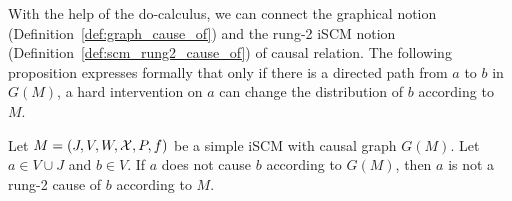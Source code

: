 With the help of the do-calculus, we can connect the graphical notion (Definition~\ref{def:graph_cause_of}) and the rung-2 iSCM notion (Definition~\ref{def:scm_rung2_cause_of}) of causal relation.
The following proposition expresses formally that only if there is a directed path from $a$ to $b$ in $G(M)$, a hard intervention on $a$ can change the distribution of $b$ according to $M$. 
\begin{Prp}\label{prp:scm_graph_cause_of}
  Let $M = \left ( J, V, W, \mathcal{X}, P, f \right )$ be a simple iSCM with causal graph $G(M)$.
  Let $a \in V \cup J$ and $b \in V$.
  If $a$ does not cause $b$ according to $G(M)$, then $a$ is not a rung-2 cause of $b$ according to $M$.
\end{Prp}
